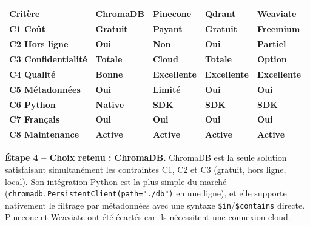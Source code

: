 \documentclass[12pt,a4paper]{report}
\begin{document}
\begin{center}
\renewcommand{\arraystretch}{1.5}
\begin{tabularx}{\linewidth}{>{\bfseries\small}p{2.5cm} X X X X}
  \toprule
  \rowcolor{rowblue}
  \textbf{Crit\`{e}re} & \textbf{ChromaDB} & \textbf{Pinecone} & \textbf{Qdrant} & \textbf{Weaviate} \\
  \midrule
  C1 Co\^{u}t          & \cellcolor{rowgreen}\textbf{Gratuit}    & \cellcolor{rowred}\textbf{Payant}      & \cellcolor{rowgreen}\textbf{Gratuit}   & \cellcolor{warnorange!30}\textbf{Freemium} \\
  C2 Hors ligne         & \cellcolor{rowgreen}\textbf{Oui}        & \cellcolor{rowred}\textbf{Non}         & \cellcolor{rowgreen}\textbf{Oui}       & \cellcolor{warnorange!30}\textbf{Partiel}  \\
  C3 Confidentialit\'{e}& \cellcolor{rowgreen}\textbf{Totale}     & \cellcolor{rowred}\textbf{Cloud}       & \cellcolor{rowgreen}\textbf{Totale}    & \cellcolor{warnorange!30}\textbf{Option}   \\
  C4 Qualit\'{e}        & \cellcolor{warnorange!30}\textbf{Bonne} & \cellcolor{rowgreen}\textbf{Excellente}& \cellcolor{rowgreen}\textbf{Excellente}& \cellcolor{rowgreen}\textbf{Excellente}   \\
  C5 M\'{e}tadonn\'{e}es& \cellcolor{rowgreen}\textbf{Oui}       & \cellcolor{warnorange!30}\textbf{Limit\'{e}} & \cellcolor{rowgreen}\textbf{Oui}  & \cellcolor{rowgreen}\textbf{Oui}          \\
  C6 Python             & \cellcolor{rowgreen}\textbf{Native}     & \cellcolor{rowgreen}\textbf{SDK}       & \cellcolor{rowgreen}\textbf{SDK}       & \cellcolor{warnorange!30}\textbf{SDK}      \\
  C7 Fran\c{c}ais       & \cellcolor{rowgreen}\textbf{Oui}        & \cellcolor{rowgreen}\textbf{Oui}       & \cellcolor{rowgreen}\textbf{Oui}       & \cellcolor{rowgreen}\textbf{Oui}          \\
  C8 Maintenance        & \cellcolor{rowgreen}\textbf{Active}     & \cellcolor{rowgreen}\textbf{Active}    & \cellcolor{rowgreen}\textbf{Active}    & \cellcolor{rowgreen}\textbf{Active}       \\
  \bottomrule
\end{tabularx}
\end{center}

\begin{successbox}
\textbf{\'{E}tape 4 -- Choix retenu : ChromaDB.}
ChromaDB est la seule solution satisfaisant simultan\'{e}ment les contraintes C1, C2 et C3
(gratuit, hors ligne, local). Son int\'{e}gration Python est la plus simple du march\'{e}
(\texttt{chromadb.PersistentClient(path="./db")} en une ligne), et elle supporte nativement
le filtrage par m\'{e}tadonn\'{e}es avec une syntaxe \texttt{\$in}/\texttt{\$contains} directe.
Pinecone et Weaviate ont \'{e}t\'{e} \'{e}cart\'{e}s car ils n\'{e}cessitent une connexion cloud.
\end{successbox}
\end{document}
